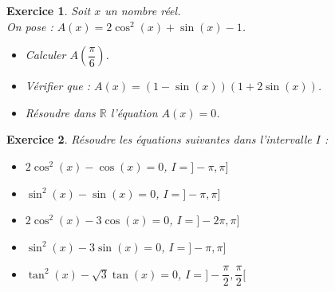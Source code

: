 \documentclass[12pt,a4paper]{article}
\theoremstyle{mystyle}
\newtheorem{exo}{Exercice}
\begin{document}
\begin{multicols*}{2}
\begin{exo}
Soit $x$ un nombre réel.\\On pose : $A(x) = 2\cos^2(x) + \sin(x) - 1$.
\begin{itemize}
    \item[a)] Calculer $A\left(\dfrac{\pi}{6}\right)$.
    \item[b)] Vérifier que : $A(x) = (1 - \sin(x))(1 + 2\sin(x))$.
    \item[c)] Résoudre dans $\mathbb{R}$ l'équation $A(x) = 0$.
\end{itemize}
\end{exo}

\begin{exo}
Résoudre les équations suivantes dans l'intervalle $I$ :
\begin{itemize}
    \item $2\cos^2(x) - \cos(x) = 0$, $I = ]-\pi,\pi]$
    \item $\sin^2(x) - \sin(x) = 0$, $I = ]-\pi,\pi]$
    \item $2\cos^2(x) - 3\cos(x) = 0$, $I = ]-2\pi,\pi]$
    \item $\sin^2(x) - 3\sin(x) = 0$, $I = ]-\pi,\pi]$
    \item $\tan^2(x) - \sqrt{3}\tan(x) = 0$, $I = ]-\dfrac{\pi}{2},\dfrac{\pi}{2}[$
\end{itemize}
\end{exo}




\end{multicols*}
\end{document}
